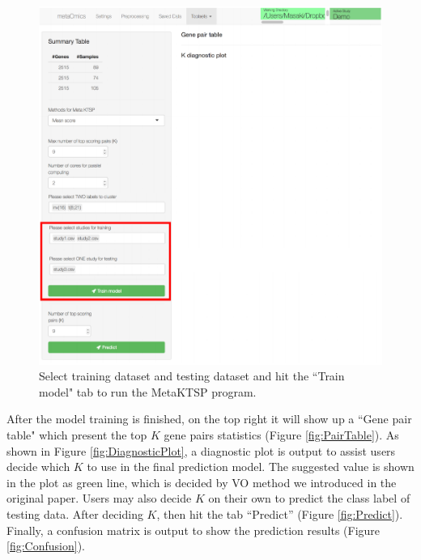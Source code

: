 \begin{figure}[H]
\begin{center}
\includegraphics[scale=0.7]{./figure/MetaKTSP/Figure8.pdf}
\caption{Select training dataset and testing dataset and hit the ``Train model" tab to run the MetaKTSP program.}
\label{fig:TrainTest}
\end{center}
\end{figure}

After the model training is finished, on the top right it will show up a ``Gene pair table" which present the top $K$ gene pairs statistics (Figure \ref{fig:PairTable}). As shown in Figure \ref{fig:DiagnosticPlot}, a diagnostic plot is output to assist users decide which $K$ to use in the final prediction model. The suggested value is shown in the plot as green line, which is decided by VO method we introduced in the original paper. Users may also decide $K$ on their own to predict the class label of testing data. After deciding $K$, then hit the tab ``Predict'' (Figure \ref{fig:Predict}). Finally, a confusion matrix is output to show the prediction results (Figure \ref{fig:Confusion}).


